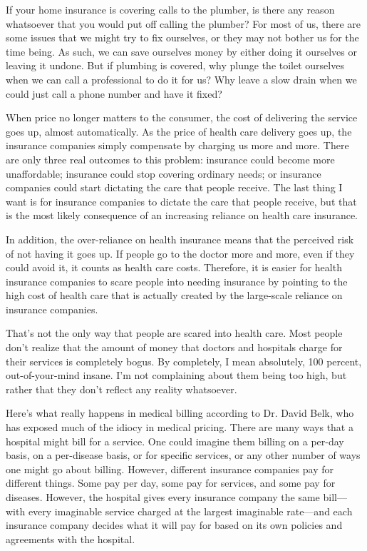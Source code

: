 If your home insurance is covering calls to the plumber, is there any
reason whatsoever
that you would put off calling the plumber?  For most of us, there are
some issues that we might try to fix ourselves, or they may not bother
us for the time being. As such, we can save ourselves money by either
doing it ourselves or leaving it undone.  But if plumbing is
covered, why plunge the toilet ourselves when we can call a
professional to do it for us?  Why leave a slow drain when we could
just call a phone number and have it fixed? 

When price no longer matters to the consumer, the cost of delivering the
service goes up, almost automatically. As the price of health care
delivery goes up, the insurance companies simply compensate by charging
us more and more. There are only three real outcomes to this problem:
insurance could become more unaffordable; insurance could stop covering
ordinary needs; or insurance companies could start dictating the care
that people receive. The last thing I want is for insurance companies
to dictate the care that people receive, but that is the most likely
consequence of an increasing reliance on health care insurance.

In addition, the over-reliance on health insurance means that the
perceived risk of not having it goes up. If people go to the doctor
more and more, even if they could avoid it, it counts as health care
costs. Therefore, it is easier for health insurance companies to scare
people into needing insurance by pointing to the high cost of health
care that is actually created by the large-scale reliance on insurance
companies. 

That's not the only way that people are scared into
health care. Most people don't realize that the amount
of money that doctors and hospitals charge for their services is
completely bogus. By completely, I mean absolutely, 100 percent,
out-of-your-mind insane. I'm not complaining about
them being too high, but rather that they don't
reflect any reality whatsoever. 

Here's what really happens in medical billing
according to Dr. David Belk, who has exposed much of the idiocy in
medical pricing. There are many ways that a hospital might bill for a
service. One could imagine them billing on a per-day basis, on a
per-disease basis, or for specific services, or any
other number of ways
one might go about billing. However, different insurance companies pay
for different things. Some pay per day, some pay for services, and some
pay for diseases.  However, the hospital gives every insurance company the
same bill---with every imaginable service charged at the largest
imaginable rate---and each insurance company decides what it will pay
for based on its own policies and agreements with the hospital.

